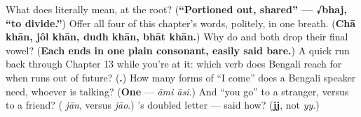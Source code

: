 \begin{tcolorbox}[breakable,colback=teal!4,colframe=teal!35!black,title={Before you move on}]
What does  literally mean, at the root? (\textbf{\textquotedblleft{}Portioned out, shared\textquotedblright{} — √bhaj, \textquotedblleft{}to divide.\textquotedblright{}}) Offer all four of this chapter's words, politely, in one breath. (\textbf{Chā khān, jôl khān, dudh khān, bhāt khān.}) Why do  and  both drop their final vowel? (\textbf{Each ends in one plain consonant, easily said bare.}) A quick run back through Chapter 13 while you're at it: which verb does Bengali reach for when  runs out of future? (\textbf{.}) How many forms of \textquotedblleft{}I come\textquotedblright{} does a Bengali speaker need, whoever is talking? (\textbf{One} — \emph{āmi āsi}.) And \textquotedblleft{}you go\textquotedblright{} to a stranger, versus to a friend? (\textbf{} \emph{jān}, versus \textbf{} \emph{jāo}.) 's doubled letter — said how? (\textbf{jj}, not \emph{yy}.)
\end{tcolorbox}
